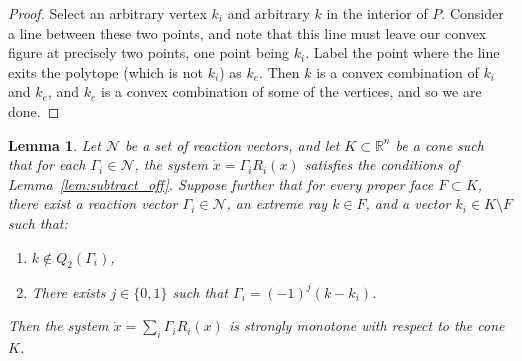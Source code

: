\documentclass{article}
\newtheorem{lem}{Lemma}
\begin{document}
\begin{proof}
    Select an arbitrary vertex $k_i$ and arbitrary $k$ in the interior of $P$. Consider a line between these two points, and note that this line must leave our convex figure at precisely two points, one point being $k_i$. Label the point where the line exits the polytope (which is not $k_i$) as $k_e$. Then $k$ is a convex combination of $k_i$ and $k_e$, and $k_e$ is a convex combination of some of the vertices, and so we are done.
\end{proof}






\begin{lem}
\label{lem:subtract_off_strong_2}
Let \( \mathcal{N} \) be a set of reaction vectors, and let \( K \subset \mathbb{R}^n \) be a cone such that for each \( \Gamma_i \in \mathcal{N} \), the system \( \dot{x} = \Gamma_i R_i(x) \) satisfies the conditions of Lemma~\ref{lem:subtract_off}. Suppose further that for every proper face \( F \subset K \), there exist a reaction vector \( \Gamma_i \in \mathcal{N} \), an extreme ray \( k \in F \), and a vector \( k_i \in K \setminus F \) such that:
\begin{enumerate}
    \item \( k \notin Q_2(\Gamma_i) \),
    \item There exists \( j \in \{0,1\} \) such that \( \Gamma_i = (-1)^j(k - k_i) \).
\end{enumerate}
Then the system \( \dot{x} = \sum_i \Gamma_i R_i(x) \) is strongly monotone with respect to the cone \( K \).
\end{lem}
\end{document}
